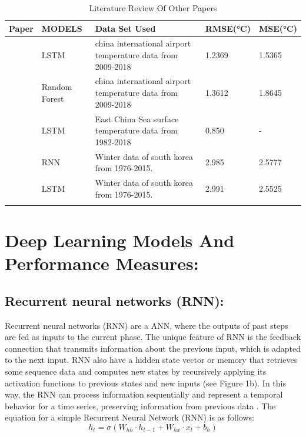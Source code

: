 \documentclass[sn-mathphys,Numbered]{sn-jnl}
\theoremstyle{thmstyleone}
\theoremstyle{thmstyletwo}
\theoremstyle{thmstylethree}
\begin{document}
\begin{table}[h]
\caption{Literature Review Of Other Papers}\label{tab1}%
\begin{tabular}{@{}lllll@{}}
\toprule
Paper & MODELS  & Data Set Used & RMSE(°C) & MSE(°C) \\
\midrule
\cite{li2019deep}    & LSTM   & china international airport temperature data from 2009-2018  &1.2369 &1.5365    \\
\cite{li2019deep}   & Random Forest   & china international airport temperature data from 2009-2018  &1.3612 &1.8645     \\
\cite{xiao2019spatiotemporal}    & LSTM   & East China Sea surface temperature data from 1982-2018   & 0.850 & -  \\
\cite{thi2020deep}  & RNN       & Winter data of south korea from 1976-2015.     & 2.985      & 2.5777    \\
\cite{thi2020deep}  & LSTM    & Winter data of south korea from 1976-2015.      & 2.991       & 2.5525 \\
\botrule
\end{tabular}
\end{table}
\section{Deep Learning Models And Performance Measures:}

\subsection {Recurrent neural networks (RNN):}
Recurrent neural networks (RNN) are a ANN, where the outputs of past steps are fed as inputs to the current phase. The unique feature of RNN is the feedback connection that transmits information about the previous input, which is adapted to the next input. RNN also have a hidden state vector or memory that retrieves some sequence data and computes new states by recursively applying its activation functions to previous states and new inputs (see Figure 1b). In this way, the RNN can process information sequentially and represent a temporal behavior for a time series, preserving information from previous data \cite{thi2020deep}.
The equation for a simple Recurrent Neural Network (RNN) is as follows:
\begin{equation}
h_t=\sigma(W_{hh} \cdot h_{t-1} + W_{hx} \cdot x_t + b_h)
\end{equation}
\end{document}
